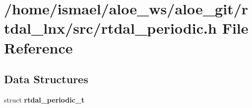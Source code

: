 \section{/home/ismael/aloe\-\_\-ws/aloe\-\_\-git/rtdal\-\_\-lnx/src/rtdal\-\_\-periodic.h File Reference}
\label{rtdal__periodic_8h}
\subsection*{Data Structures}
\begin{DoxyCompactItemize}
\item 
struct {\bf rtdal\-\_\-periodic\-\_\-t}
\end{DoxyCompactItemize}
